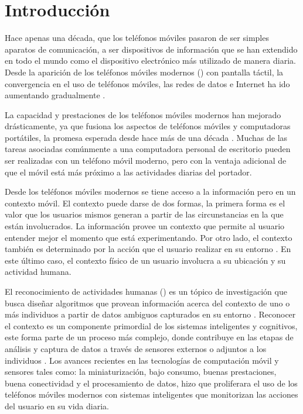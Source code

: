 
\chapter{Introducción}

\label{chap1:introduccion}

Hace apenas una década, que los teléfonos móviles pasaron de ser simples
aparatos de comunicación, a ser dispositivos de información que se
han extendido en todo el mundo como el dispositivo electrónico más
utilizado de manera diaria. Desde la aparición de los teléfonos móviles
modernos () con pantalla táctil, la convergencia
en el uso de teléfonos móviles, las redes de datos e Internet ha ido
aumentando gradualmente \cite{Fling2009}.

La capacidad y prestaciones de los teléfonos móviles modernos han
mejorado drásticamente, ya que fusiona los aspectos de teléfonos móviles
y computadoras portátiles, la promesa esperada desde hace más de una
década \cite{Tanenbaum2010}. Muchas de las tareas asociadas comúnmente
a una computadora personal de escritorio pueden ser realizadas con
un teléfono móvil moderno, pero con la ventaja adicional de que el
móvil está más próximo a las actividades diarias del portador.

Desde los teléfonos móviles modernos se tiene acceso a la información
pero en un contexto móvil. El contexto puede darse de dos formas,
la primera forma es el valor que los usuarios mismos generan a partir
de las circunstancias en la que están involucrados. La información
provee un contexto que permite al usuario entender mejor el momento
que está experimentando. Por otro lado, el contexto también es determinado
por la acción que el usuario realizar en su entorno \cite{Fling2009}.
En este último caso, el contexto físico de un usuario involucra a
su ubicación y su actividad humana. 

El reconocimiento de actividades humanas () es un tópico
de investigación que busca diseñar algoritmos que provean información
acerca del contexto de uno o más individuos a partir de datos ambiguos
capturados en su entorno \cite{Bao2004}. Reconocer el contexto es
un componente primordial de los sistemas inteligentes y cognitivos,
este forma parte de un proceso más complejo, donde contribuye en las
etapas de análisis y captura de datos a través de sensores externos
o adjuntos a los individuos \cite{ReyesOrtiz2015,Chen2012}. Los avances
recientes en las tecnologías de computación móvil y sensores tales
como: la miniaturización, bajo consumo, buenas prestaciones, buena
conectividad y el procesamiento de datos, hizo que proliferara el
uso de los teléfonos móviles modernos con sistemas inteligentes que
monitorizan las acciones del usuario en su vida diaria. 

